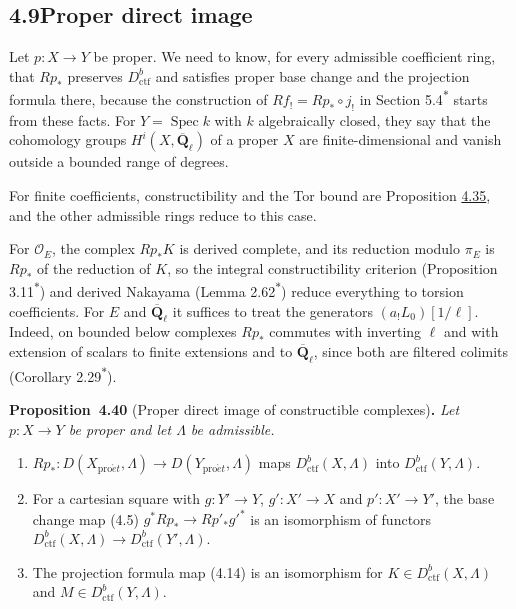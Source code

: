 \documentclass[11pt]{article}
\newenvironment{bpstatement}[2]{\par\addvspace{0.6\baselineskip}\noindent\textbf{#1}#2\textbf{.}\enspace\ignorespaces}
  {\par\addvspace{0.4\baselineskip}}
\newenvironment{bpstatementit}[2]{\begin{bpstatement}{#1}{#2}\itshape\ignorespaces}{\end{bpstatement}}
\newcommand{\bpout}[1]{#1\textsuperscript{\hyperlink{bp-outside}{\ensuremath{\ast}}}}
\begin{document}
\subsection*{\texorpdfstring{4.9\quad Proper direct image}{4.9 Proper direct image}}
\label{bp119}%
\label{bp120}%
Let \(p:X\to Y\) be proper. We need to know, for every admissible coefficient ring, that \(Rp_*\) preserves \(D^b_{\mathrm{ctf}}\) and satisfies proper base change and the projection formula there, because the construction of \(Rf_!=Rp_*\circ j_!\) in Section \bpout{5.4} starts from these facts. For \(Y=\operatorname{Spec}k\) with \(k\) algebraically closed, they say that the cohomology groups \(H^i(X,\overline{\mathbf Q}_\ell)\) of a proper \(X\) are finite-dimensional and vanish outside a bounded range of degrees.

For finite coefficients, constructibility and the Tor bound are Proposition \hyperref[bp106]{4.35}, and the other admissible rings reduce to this case.

For \(\mathcal O_E\), the complex \(Rp_*K\) is derived complete, and its reduction modulo \(\pi_E\) is \(Rp_*\) of the reduction of \(K\), so the integral constructibility criterion (Proposition \bpout{3.11}) and derived Nakayama (Lemma \bpout{2.62}) reduce everything to torsion coefficients. For \(E\) and \(\overline{\mathbf Q}_\ell\) it suffices to treat the generators \((a_!L_0)[1/\ell]\). Indeed, on bounded below complexes \(Rp_*\) commutes with inverting \(\ell\) and with extension of scalars to finite extensions and to \(\overline{\mathbf Q}_\ell\), since both are filtered colimits (Corollary \bpout{2.29}).

\label{bp121}%
\begin{bpstatementit}{Proposition~4.40}{ (Proper direct image of constructible complexes)}
Let \(p:X\to Y\) be proper and let \(\Lambda\) be admissible.

\begin{enumerate}
\item \(Rp_*:D(X_{\mathrm{pro}\acute{e}t},\Lambda)\to D(Y_{\mathrm{pro}\acute{e}t},\Lambda)\) maps \(D^b_{\mathrm{ctf}}(X,\Lambda)\) into \(D^b_{\mathrm{ctf}}(Y,\Lambda)\).
\item For a cartesian square with \(g:Y'\to Y\), \(g':X'\to X\) and \(p':X'\to Y'\), the base change map (4.5) \(g^*Rp_*\to Rp'_*g'^*\) is an isomorphism of functors \(D^b_{\mathrm{ctf}}(X,\Lambda)\to D^b_{\mathrm{ctf}}(Y',\Lambda)\).
\item The projection formula map (4.14) is an isomorphism for \(K\in D^b_{\mathrm{ctf}}(X,\Lambda)\) and \(M\in D^b_{\mathrm{ctf}}(Y,\Lambda)\).
\end{enumerate}
\end{bpstatementit}
\end{document}
